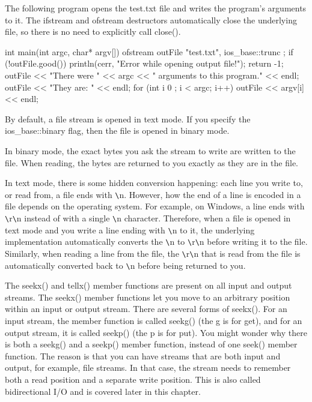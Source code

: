 The following program opens the test.txt file and writes the program’s arguments to it. The ifstream and ofstream destructors automatically close the underlying file, so there is no need to explicitly call close().

\begin{cpp}
int main(int argc, char* argv[])
{
    ofstream outFile { "test.txt", ios_base::trunc };
    if (!outFile.good()) {
        println(cerr, "Error while opening output file!");
        return -1;
    }
    outFile << "There were " << argc << " arguments to this program." << endl;
    outFile << "They are: " << endl;
    for (int i { 0 }; i < argc; i++) {
        outFile << argv[i] << endl;
    }
}
\end{cpp}


By default, a file stream is opened in text mode. If you specify the ios\_base::binary flag, then the file is opened in binary mode.

In binary mode, the exact bytes you ask the stream to write are written to the file. When reading, the bytes are returned to you exactly as they are in the file.

In text mode, there is some hidden conversion happening: each line you write to, or read from, a file ends with \verb|\|n. However, how the end of a line is encoded in a file depends on the operating system. For example, on Windows, a line ends with \verb|\|r\verb|\|n instead of with a single \verb|\|n character. Therefore, when a file is opened in text mode and you write a line ending with \verb|\|n to it, the underlying implementation automatically converts the \verb|\|n to \verb|\|r\verb|\|n before writing it to the file. Similarly, when reading a line from the file, the \verb|\|r\verb|\|n that is read from the file is automatically converted back to \verb|\|n before being returned to you.


The seekx() and tellx() member functions are present on all input and output streams. The seekx() member functions let you move to an arbitrary position within an input or output stream. There are several forms of seekx(). For an input stream, the member function is called seekg() (the g is for get), and for an output stream, it is called seekp() (the p is for put). You might wonder why there is both a seekg() and a seekp() member function, instead of one seek() member function. The reason is that you can have streams that are both input and output, for example, file streams. In that case, the stream needs to remember both a read position and a separate write position. This is also called bidirectional I/O and is covered later in this chapter.

